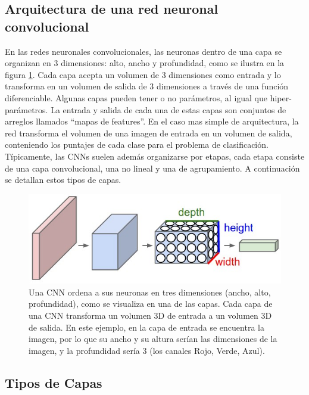 \documentclass[a4paper,11pt,spanish]{book}
\begin{document}
    \subsection {Arquitectura de una red neuronal convolucional}
      En las redes neuronales convolucionales, las neuronas dentro de una capa se organizan en 3 dimensiones: alto, ancho y profundidad, como se ilustra en la figura \ref{fig:cnn}.
      Cada capa acepta un volumen de 3 dimensiones como entrada y lo transforma en un volumen de salida de 3 dimensiones a través de una función diferenciable.
      Algunas capas pueden tener o no parámetros, al igual que hiper-parámetros. La entrada y salida de cada una de estas capas son conjuntos de arreglos llamados “mapas de features”.
      En el caso mas simple de arquitectura, la red transforma el volumen de una imagen de entrada en un volumen de salida, conteniendo los puntajes de cada clase para el problema de clasificación.
      Típicamente, las CNNs suelen además organizarse por etapas, cada etapa consiste de una capa convolucional, una no lineal y una de agrupamiento.
      A continuación se detallan estos tipos de capas.
      \begin{figure}[H]
	\begin{center}
	\includegraphics[width=0.8\linewidth]{./img/stanford_cnn.jpeg}
	\end{center}
	\caption{Una CNN ordena a sus neuronas en tres dimensiones (ancho, alto, profundidad), como se visualiza en una de
	  las capas. Cada capa de una CNN transforma un volumen 3D de entrada a un volumen 3D de salida. En este ejemplo, en la capa de entrada se encuentra la imagen, por lo que su ancho y su altura
	  serían las dimensiones de la imagen, y la profundidad sería 3 (los canales Rojo, Verde, Azul). \cite{Karpathy:Stanford}}
	\label{fig:cnn}
      \end{figure}
      
    \subsection {Tipos de Capas}
\end{document}
